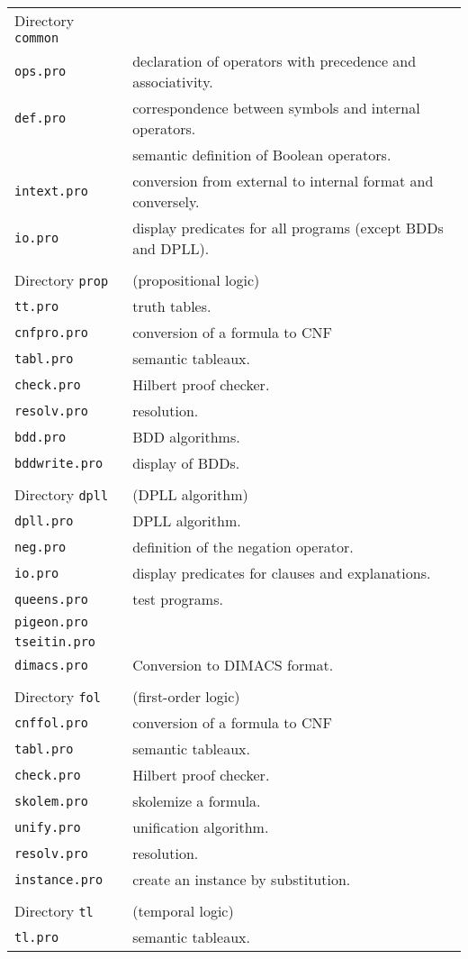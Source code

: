 \documentclass[11pt]{article}
\newcommand*{\p}[1]{\textup{\texttt{#1}}}
\begin{document}
\begin{tabular}{l@{\hspace{3em}}l}
Directory \p{common}&\\
\p{ops.pro}      & declaration of operators with precedence and
associativity.\\
\p{def.pro}      & correspondence between symbols and internal operators.\\
            & semantic definition of Boolean operators.\\
\p{intext.pro}   & conversion from external to internal format and conversely.\\
\p{io.pro}       & display predicates for all programs (except BDDs and DPLL).\\
\\
Directory \p{prop} &  (propositional logic)\\
\p{tt.pro}       & truth tables.\\
\p{cnfpro.pro}   & conversion of a formula to CNF\\
\p{tabl.pro}     & semantic tableaux.\\
\p{check.pro}    & Hilbert proof checker.\\
\p{resolv.pro}   & resolution.\\
\p{bdd.pro}      & BDD algorithms.\\
\p{bddwrite.pro} & display of BDDs.\\
\\
Directory \p{dpll} &  (DPLL algorithm)\\
\p{dpll.pro}     & DPLL algorithm.\\
\p{neg.pro}      & definition of the negation operator.\\
\p{io.pro}       & display predicates for clauses and explanations.\\
\p{queens.pro} & test programs.\\
\p{pigeon.pro} & \\
\p{tseitin.pro} & \\
\p{dimacs.pro}   & Conversion to DIMACS format.\\
\\
Directory \p{fol}  & (first-order logic)\\
\p{cnffol.pro}   & conversion of a formula to CNF\\
\p{tabl.pro}     & semantic tableaux.\\
\p{check.pro}    & Hilbert proof checker.\\
\p{skolem.pro}   & skolemize a formula.\\
\p{unify.pro}    & unification algorithm.\\
\p{resolv.pro}   & resolution.\\
\p{instance.pro} & create an instance by substitution.\\
\\
Directory \p{tl}  &   (temporal logic)\\
\p{tl.pro}       & semantic tableaux.\\
\end{tabular}
\end{document}
